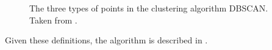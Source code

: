\begin{figure}
\caption{The three types of points in the clustering algorithm DBSCAN. Taken from \cite[Page 528]{pang2006introduction}.}
\label{dbscan_point_types}
\end{figure}

Given these definitions, the algorithm is described in .

